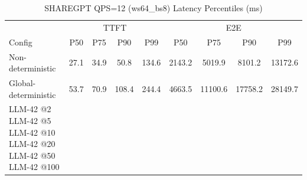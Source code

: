 \begin{table}[htbp]
\centering
\caption{SHAREGPT QPS=12 (ws64_bs8) Latency Percentiles (ms)}
\label{tab:sharegpt_qps12_ws64_bs8}
\begin{tabular}{l|cccc|cccc}
\toprule
& \multicolumn{4}{c|}{TTFT} & \multicolumn{4}{c}{E2E} \\
Config & P50 & P75 & P90 & P99 & P50 & P75 & P90 & P99 \\
\midrule
Non-deterministic & 27.1 & 34.9 & 50.8 & 134.6 & 2143.2 & 5019.9 & 8101.2 & 13172.6 \\
Global-deterministic & 53.7 & 70.9 & 108.4 & 244.4 & 4663.5 & 11100.6 & 17758.2 & 28149.7 \\
LLM-42 @2%
LLM-42 @5%
LLM-42 @10%
LLM-42 @20%
LLM-42 @50%
LLM-42 @100%
\bottomrule
\end{tabular}
\end{table}

